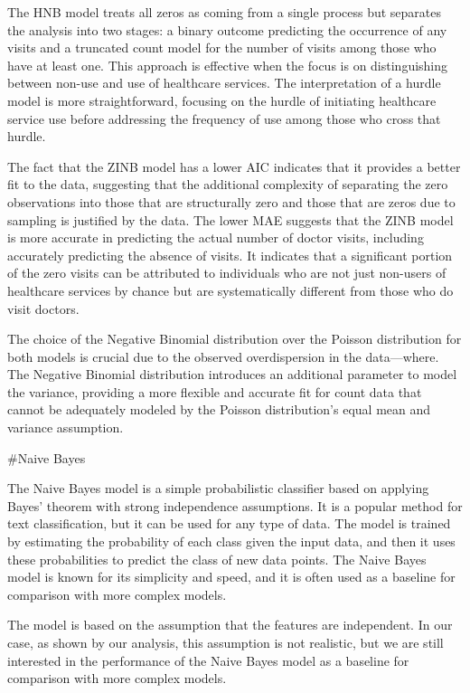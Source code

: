 \documentclass[
]{article}
\begin{document}
The HNB model treats all zeros as coming from a single process but
separates the analysis into two stages: a binary outcome predicting the
occurrence of any visits and a truncated count model for the number of
visits among those who have at least one. This approach is effective
when the focus is on distinguishing between non-use and use of
healthcare services. The interpretation of a hurdle model is more
straightforward, focusing on the hurdle of initiating healthcare service
use before addressing the frequency of use among those who cross that
hurdle.

The fact that the ZINB model has a lower AIC indicates that it provides
a better fit to the data, suggesting that the additional complexity of
separating the zero observations into those that are structurally zero
and those that are zeros due to sampling is justified by the data. The
lower MAE suggests that the ZINB model is more accurate in predicting
the actual number of doctor visits, including accurately predicting the
absence of visits. It indicates that a significant portion of the zero
visits can be attributed to individuals who are not just non-users of
healthcare services by chance but are systematically different from
those who do visit doctors.

The choice of the Negative Binomial distribution over the Poisson
distribution for both models is crucial due to the observed
overdispersion in the data---where. The Negative Binomial distribution
introduces an additional parameter to model the variance, providing a
more flexible and accurate fit for count data that cannot be adequately
modeled by the Poisson distribution's equal mean and variance
assumption.

\#Naive Bayes

The Naive Bayes model is a simple probabilistic classifier based on
applying Bayes' theorem with strong independence assumptions. It is a
popular method for text classification, but it can be used for any type
of data. The model is trained by estimating the probability of each
class given the input data, and then it uses these probabilities to
predict the class of new data points. The Naive Bayes model is known for
its simplicity and speed, and it is often used as a baseline for
comparison with more complex models.

The model is based on the assumption that the features are independent.
In our case, as shown by our analysis, this assumption is not realistic,
but we are still interested in the performance of the Naive Bayes model
as a baseline for comparison with more complex models.
\end{document}
